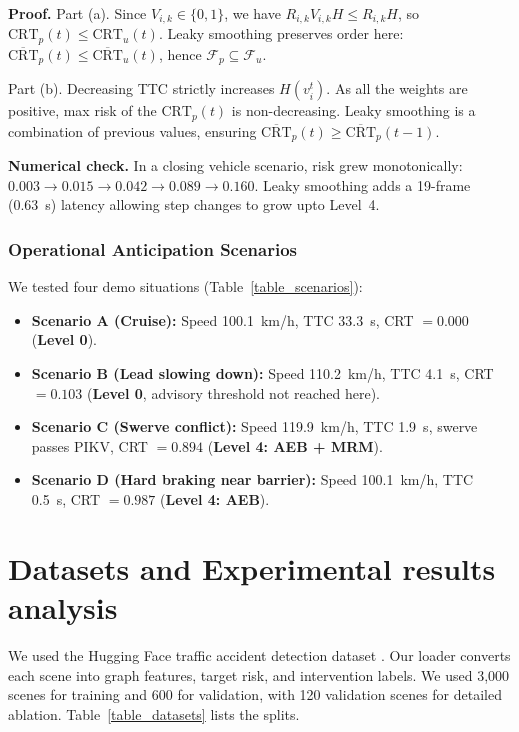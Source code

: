 \documentclass[preprint,12pt]{elsarticle}
\begin{document}
\textbf{Proof.} Part (a). Since $V_{i,k} \in \{0, 1\}$, we have $R_{i,k} V_{i,k} H \le R_{i,k} H$, so $\text{CRT}_p(t) \le \text{CRT}_u(t)$. Leaky smoothing preserves order here: $\overline{\text{CRT}}_p(t) \le \overline{\text{CRT}}_u(t)$, hence $\mathcal{F}_p \subseteq \mathcal{F}_u$.

Part (b). Decreasing TTC strictly increases $H(v_i^t)$. As all the weights are positive, max risk of the $\text{CRT}_p(t)$ is non-decreasing. Leaky smoothing is a combination of previous values, ensuring $\overline{\text{CRT}}_p(t) \ge \overline{\text{CRT}}_p(t-1)$. 

\textbf{Numerical check.} In a closing vehicle scenario, risk grew monotonically: $0.003 \rightarrow 0.015 \rightarrow 0.042 \rightarrow 0.089 \rightarrow 0.160$. Leaky smoothing adds a 19-frame (0.63~s) latency allowing step changes to grow upto Level~4.

\subsubsection{Operational Anticipation Scenarios}
We tested four demo situations (Table~\ref{table_scenarios}):
\begin{itemize}
    \item \textbf{Scenario A (Cruise):} Speed 100.1~km/h, TTC 33.3~s, CRT $= 0.000$ (\textbf{Level 0}).
    \item \textbf{Scenario B (Lead slowing down):} Speed 110.2~km/h, TTC 4.1~s, CRT $= 0.103$ (\textbf{Level 0}, advisory threshold not reached here).
    \item \textbf{Scenario C (Swerve conflict):} Speed 119.9~km/h, TTC 1.9~s, swerve passes PIKV, CRT $= 0.894$ (\textbf{Level 4: AEB + MRM}).
    \item \textbf{Scenario D (Hard braking near barrier):} Speed 100.1~km/h, TTC 0.5~s, CRT $= 0.987$ (\textbf{Level 4: AEB}).
\end{itemize}

\section{Datasets and Experimental results analysis} \label{section4}
We used the Hugging Face traffic accident detection dataset \cite{hiennguyen2024accident}. Our loader converts each scene into graph features, target risk, and intervention labels. We used 3,000 scenes for training and 600 for validation, with 120 validation scenes for detailed ablation. Table~\ref{table_datasets} lists the splits.
\end{document}
